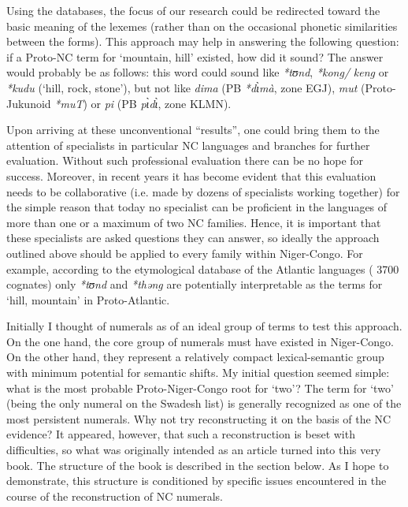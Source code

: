 Using the databases, the focus of our research could be redirected toward the basic meaning of the lexemes (rather than on the occasional phonetic similarities between the forms). This approach may help in answering the following question: if a Proto-NC term for ‘mountain, hill’ existed, how did it sound? The answer would probably be as follows: this word could sound like \textit{*tʊnd}, \textit{*kong/} \textit{keng} or \textit{*kudu} (‘hill, rock, stone’), but not like \textit{dima} (PB \textit{*d{\`{ɩ}}m{\`{a}}}, zone EGJ), \textit{mut} (Proto-Jukunoid \textit{*muT}) or \textit{pi} (PB \textit{p{\`{ɩ}}d{\`{ɩ}}}, zone KLMN). 

Upon arriving at these unconventional “results”, one could bring them to the attention of specialists in particular NC languages and branches for further evaluation. Without such professional evaluation there can be no hope for success.  Moreover, in recent years it has become evident that this evaluation needs to be collaborative (i.e. made by dozens of specialists working together) for the simple reason that today no specialist can be proficient in the languages of more than one or a maximum of two NC families. Hence, it is important that these specialists are asked questions they can answer, so ideally the approach outlined above should be applied to every family within Niger-Congo. For example, according to the etymological database of the Atlantic languages (\citealt{PozdniakovSegerer2017} 3700 cognates) only \textit{*t}\textit{ʊnd} and \textit{*th}\textit{əng} are potentially interpretable as the terms for ‘hill, mountain’ in Proto-Atlantic.

Initially I thought of numerals as of an ideal group of terms to test this approach. On the one hand, the core group of numerals must have existed in Niger-Congo. On the other hand, they represent a relatively compact lexical-semantic group with minimum potential for semantic shifts. My initial question seemed simple: what is the most probable Proto-Niger-Congo root for ‘two’? The term for ‘two’ (being the only numeral on the Swadesh list) is generally recognized as one of the most persistent numerals. Why not try reconstructing it on the basis of the NC evidence? It appeared, however, that such a reconstruction is beset with difficulties, so what was originally intended as an article turned into this very book. The structure of the book is described in the section below. As I hope to demonstrate, this structure is conditioned by specific issues encountered in the course of the reconstruction of NC numerals. 

